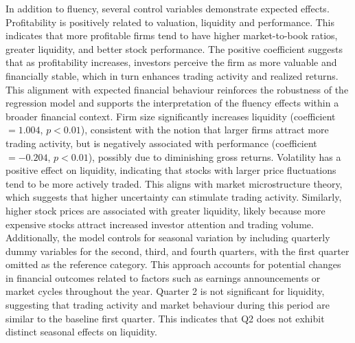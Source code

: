 \documentclass[a4paper,11pt]{report}
\begin{document}
In addition to fluency, several control variables demonstrate expected effects. Profitability is positively related to valuation, liquidity and performance. This indicates that more profitable firms tend to have higher market-to-book ratios, greater liquidity, and better stock performance. The positive coefficient suggests that as profitability increases, investors perceive the firm as more valuable and financially stable, which in turn enhances trading activity and realized returns. This alignment with expected financial behaviour reinforces the robustness of the regression model and supports the interpretation of the fluency effects within a broader financial context. Firm size significantly increases liquidity (coefficient $= 1.004$, $p < 0.01$), consistent with the notion that larger firms attract more trading activity, but is negatively associated with performance (coefficient $= -0.204$, $p < 0.01$), possibly due to diminishing gross returns. Volatility has a positive effect on liquidity, indicating that stocks with larger price fluctuations tend to be more actively traded. This aligns with market microstructure theory, which suggests that higher uncertainty can stimulate trading activity. Similarly, higher stock prices are associated with greater liquidity, likely because more expensive stocks attract increased investor attention and trading volume. Additionally, the model controls for seasonal variation by including quarterly dummy variables for the second, third, and fourth quarters, with the first quarter omitted as the reference category. This approach accounts for potential changes in financial outcomes related to factors such as earnings announcements or market cycles throughout the year. Quarter 2 is not significant for liquidity, suggesting that trading activity and market behaviour during this period are similar to the baseline first quarter. This indicates that Q2 does not exhibit distinct seasonal effects on liquidity.
\end{document}
